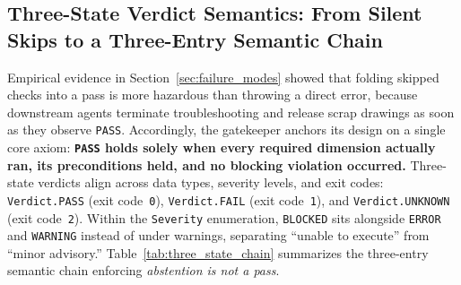 \documentclass[nocopyright,nolists,upint,varvw,hyphenate]{asmejour}
\begin{document}
\subsection{Three-State Verdict Semantics: From Silent Skips to a Three-Entry Semantic Chain}\label{sec:three_state}

Empirical evidence in Section~\ref{sec:failure_modes} showed that folding skipped checks into a pass is more hazardous than throwing a direct error, because downstream agents terminate troubleshooting and release scrap drawings as soon as they observe \texttt{PASS}. Accordingly, the gatekeeper anchors its design on a single core axiom: \textbf{\texttt{PASS} holds solely when every required dimension actually ran, its preconditions held, and no blocking violation occurred.} Three-state verdicts align across data types, severity levels, and exit codes: \texttt{Verdict.PASS} (exit code~\texttt{0}), \texttt{Verdict.FAIL} (exit code~\texttt{1}), and \texttt{Verdict.UNKNOWN} (exit code~\texttt{2}). Within the \texttt{Severity} enumeration, \texttt{BLOCKED} sits alongside \texttt{ERROR} and \texttt{WARNING} instead of under warnings, separating ``unable to execute'' from ``minor advisory.'' Table~\ref{tab:three_state_chain} summarizes the three-entry semantic chain enforcing \emph{abstention is not a pass}.
\end{document}
